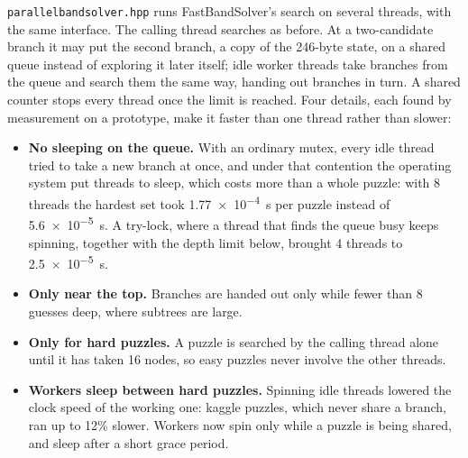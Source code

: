 \documentclass[11pt]{article}
\theoremstyle{definition}
\theoremstyle{plain}
\begin{document}
\texttt{parallelbandsolver.hpp} runs FastBandSolver's search on several threads, with the same interface. The calling
thread searches as before. At a two-candidate branch it may put the second branch, a copy of the 246-byte state, on a
shared queue instead of exploring it later itself; idle worker threads take branches from the queue and search them the
same way, handing out branches in turn. A shared counter stops every thread once the limit is reached. Four details,
each found by measurement on a prototype, make it faster than one thread rather than slower:
\begin{itemize}
\item \textbf{No sleeping on the queue.} With an ordinary mutex, every idle thread tried to take a new branch at once, and
  under that contention the operating system put threads to sleep, which costs more than a whole puzzle: with 8 threads
  the hardest set took \SI{1.77e-4}{\second} per puzzle instead of \SI{5.6e-5}{\second}. A try-lock, where a thread that finds the queue busy keeps
  spinning, together with the depth limit below, brought 4 threads to \SI{2.5e-5}{\second}.
\item \textbf{Only near the top.} Branches are handed out only while fewer than 8 guesses deep, where subtrees are large.
\item \textbf{Only for hard puzzles.} A puzzle is searched by the calling thread alone until it has taken 16 nodes, so
  easy puzzles never involve the other threads.
\item \textbf{Workers sleep between hard puzzles.} Spinning idle threads lowered the clock speed of the working one:
  kaggle puzzles, which never share a branch, ran up to 12\% slower. Workers now spin only while a puzzle is being shared,
  and sleep after a short grace period.
\end{itemize}
\end{document}
